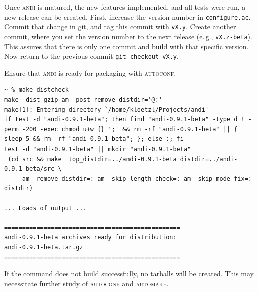\documentclass[a4paper,
  10pt,
  english,
  DIV=12,
  BCOR=8mm]{scrbook}
\newcommand{\algo}[1]{\textsc{{#1}}}
\newcommand{\andi}{\algo{andi} }
\begin{document}
Once \andi is matured, the new features implemented, and all tests were run, a new release can be created. First, increase the version number in \lstinline$configure.ac$. Commit that change in git, and tag this commit with \lstinline$vX.y$. Create another commit, where you set the version number to the next release (e.\,g., \lstinline$vX.z-beta$). This assures that there is only one commit and build with that specific version. Now return to the previous commit \lstinline$git checkout vX.y$.

Ensure that \andi is ready for packaging with \algo{autoconf}.

\begin{lstlisting}
~ % make distcheck
make  dist-gzip am__post_remove_distdir='@:'
make[1]: Entering directory `/home/kloetzl/Projects/andi'
if test -d "andi-0.9.1-beta"; then find "andi-0.9.1-beta" -type d ! -perm -200 -exec chmod u+w {} ';' && rm -rf "andi-0.9.1-beta" || { sleep 5 && rm -rf "andi-0.9.1-beta"; }; else :; fi
test -d "andi-0.9.1-beta" || mkdir "andi-0.9.1-beta"
 (cd src && make  top_distdir=../andi-0.9.1-beta distdir=../andi-0.9.1-beta/src \
     am__remove_distdir=: am__skip_length_check=: am__skip_mode_fix=: distdir)

... Loads of output ...

=================================================
andi-0.9.1-beta archives ready for distribution: 
andi-0.9.1-beta.tar.gz
=================================================
\end{lstlisting}

If the command does not build successfully, no tarballs will be created. This may necessitate further study of \algo{autoconf} and \algo{automake}. 



\backmatter

\end{document}
